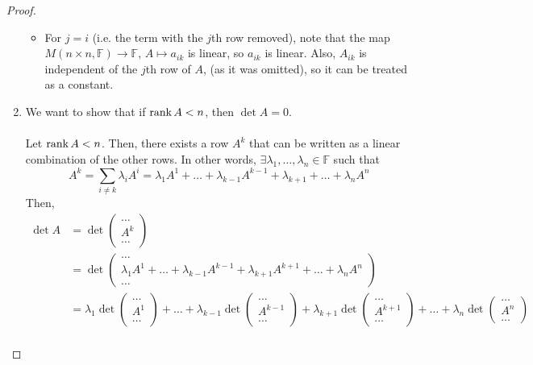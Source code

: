 \documentclass[letterpaper,12pt]{article}
\begin{document}
\begin{proof}
\begin{enumerate}
\begin{itemize}
        \item For $j = i$ (i.e. the term with the $j$th row removed), note that the map $M(n \times n, \mathbb{F}) \rightarrow \mathbb{F}$, $A \mapsto a_{ik}$ is linear, so $a_{ik}$ is linear. Also, $A_{ik}$ is independent of the $j$th row of $A$, (as it was omitted), so it can be treated as a constant.
    \end{itemize}
    \item We want to show that if $\operatorname{rank}{A} < n$, then $\det{A} = 0$.
    \\ \\ Let $\operatorname{rank}{A} < n$. Then, there exists a row $A^k$ that can be written as a linear combination of the other rows. In other words, $\exists \lambda_1, \dots, \lambda_n \in \mathbb{F}$ such that
    \begin{equation*}
        A^k = \sum_{i \neq k} \lambda_i A^i = \lambda_1 A^1 + \dots + \lambda_{k-1} A^{k-1} + \lambda_{k+1} + \dots + \lambda_n A^n
    \end{equation*}
    Then,
    \begin{align*}
        \det{A} & = \det{\begin{pmatrix} \dots \\ A^k \\ \dots \end{pmatrix}} \\
        & = \det{\begin{pmatrix} \dots \\ \lambda_1 A^1 + \dots + \lambda_{k-1} A^{k-1} + \lambda_{k+1} A^{k+1} + \dots + \lambda_n A^n \\ \dots \end{pmatrix}} \\
        & = \lambda_1 \det{\begin{pmatrix} \dots \\ A^1 \\ \dots \end{pmatrix}} + \dots + \lambda_{k-1} \det{\begin{pmatrix} \dots \\ A^{k-1} \\ \dots \end{pmatrix}} + \lambda_{k+1} \det{\begin{pmatrix} \dots \\ A^{k+1} \\ \dots \end{pmatrix}} + \dots + \lambda_n \det{\begin{pmatrix} \dots \\ A^n \\ \dots \end{pmatrix}} \\

\end{align*}
\end{enumerate}
\end{proof}
\end{document}
